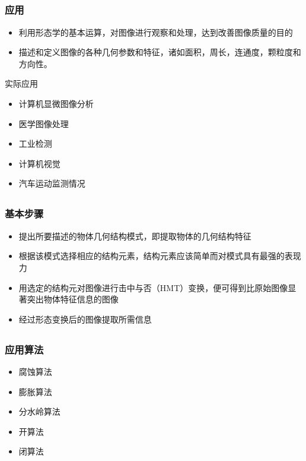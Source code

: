 \documentclass[notheorems,mathserif,table,compress]{beamer}  %
\begin{document}
\subsection{}
\begin{frame}
   \frametitle{应用}
   \begin{itemize}
   \item 利用形态学的基本运算，对图像进行观察和处理，达到改善图像质量的目的
   \item 描述和定义图像的各种几何参数和特征，诸如面积，周长，连通度，颗粒度和方向性。
   \end{itemize}
   实际应用
   \begin{itemize}
   \item 计算机显微图像分析
   \item 医学图像处理
   \item 工业检测
   \item 计算机视觉
   \item 汽车运动监测情况
   \end{itemize}
\end{frame}

\subsection{}
\begin{frame}
   \frametitle{基本步骤}
   \begin{itemize}
   \item 提出所要描述的物体几何结构模式，即提取物体的几何结构特征
   \item 根据该模式选择相应的结构元素，结构元素应该简单而对模式具有最强的表现力
   \item 用选定的结构元对图像进行击中与否（HMT）变换，便可得到比原始图像显著突出物体特征信息的图像
   \item 经过形态变换后的图像提取所需信息
   \end{itemize}
\end{frame}

\subsection{}
\begin{frame}
   \frametitle{应用算法}
   \begin{itemize}
   \item 腐蚀算法
   \item 膨胀算法
   \item 分水岭算法
   \item 开算法
   \item 闭算法
   \end{itemize}
\end{frame}
\end{document}
